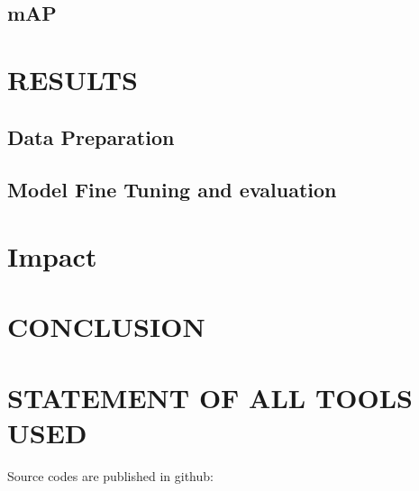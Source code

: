 \documentclass{article}
\begin{document}
\subsection{mAP}


\section{RESULTS}
\label{sec:results}

\subsection{Data Preparation}
\label{ssec:data}


  \subsection{Model Fine Tuning and evaluation}
  \label{ssec:model}

\section{Impact}
  
\section{CONCLUSION}
\label{sec:conclusion}


\section{STATEMENT OF ALL TOOLS USED}
\label{sec:statementofalltoolsused}


Source codes are published in github: 





\vfill\pagebreak



\end{document}
